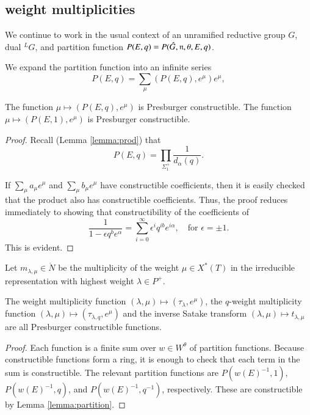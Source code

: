 \subsection{weight multiplicities}

We continue to work in the usual context of an unramified reductive
group $G$, dual ${}^LG$, and partition function
$P(E,q)=P(\hat G,{\mathfrak n},\theta,E,q)$.

We expand the partition function into an infinite series
\[
P(E,q) = \sum_\mu (P(E,q),e^\mu) e^{\mu},
\]

\begin{lemma}\label{lemma:partition}
  The function $\mu\mapsto (P(E,q),e^\mu)$ is Presburger
  constructible.  The function $\mu\mapsto (P(E,1),e^\mu)$ is
  Presburger constructible.
\end{lemma}

\begin{proof} 
Recall (Lemma \ref{lemma:prod}) that
\[
P(E,q) = \prod_{\Sigma_1^+} \frac{1}{d_\alpha(q)}.
\]


If $\sum_\mu a_\mu e^\mu$ and $\sum_\mu b_\mu e^\mu$ have
constructible coefficients, then it is easily checked that the product
also has constructible coefficients.  Thus, the proof reduces
immediately to showing that constructibility of the coefficients of
\[
\frac{1}{1-\epsilon q^b e^\alpha} 
= \sum_{i=0}^\infty \epsilon^i q^{i b} e^{i\alpha}, \quad \text{for } \epsilon=\pm1.
\]
This is evident.
\end{proof}

Let $m_{\lambda,\mu}\in \ring{N}$ be the multiplicity of the weight
$\mu\in X^*(T)$ in the irreducible representation with highest weight
$\lambda\in P^+$.

\begin{lemma}  
  The weight multiplicity function $(\lambda,\mu)\mapsto
  (\tau_\lambda,e^\mu)$, the $q$-weight multiplicity function
  $(\lambda,\mu)\mapsto (\tau_{\lambda,q},e^\mu)$ and the inverse
  Satake transform $(\lambda,\mu)\mapsto t_{\lambda,\mu}$ are all
  Presburger constructible functions.
\end{lemma}

\begin{proof} 
  Each function is a finite sum over $w\in W^\theta$ of partition
  functions.  Because constructible functions form a ring, it is
  enough to check that each term in the sum is constructible.  The
  relevant partition functions are $P(w(E)^{-1},1)$, $P(w(E)^{-1},q)$,
  and $P(w(E)^{-1},q^{-1})$, respectively.  These are constructible by
  Lemma \ref{lemma:partition}.
\end{proof}

